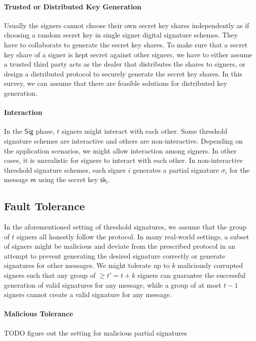 \paragraph{Trusted or Distributed Key Generation} Usually the signers cannot choose their own secret key shares independently as if choosing a random secret key in single signer digital signature schemes. They have to collaborate to generate the secret key shares. To make sure that a secret key share of a signer is kept secret against other signers, we have to either assume a trusted third party acts as the dealer that distributes the shares to signers, or design a distributed protocol to securely generate the secret key shares. In this survey, we can assume that there are feasible solutions for distributed key generation.  

\paragraph{Interaction} In the $\mathsf{Sig}$ phase, $t$ signers might interact with each other. Some threshold signature schemes are interactive and others are non-interactive. Depending on the application scenarios, we might allow interaction among signers. In other cases, it is unrealistic for signers to interact with each other. In non-interactive threshold signature schemes, each signer $i$ generates a partial signature $\sigma_i$ for the message $\mathsf{m}$ using the secret key $\mathsf{sk_i}$. 

\subsection{Fault Tolerance} 
In the aforementioned setting of threshold signatures, we assume that the group of $t$ signers all honestly follow the protocol. In many real-world settings, a subset of signers might be malicious and deviate from the prescribed protocol in an attempt to prevent generating the desired signature correctly or generate signatures for other messages. We might tolerate up to $k$ maliciously corrupted signers such that any group of $\ge t'=t+k$ signers can guarantee the successful generation of valid signatures for any message, while a group of at most $t-1$ signers cannot create a valid signature for any message. 

\paragraph{Malicious Tolerance} {\color{red} TODO figure out the setting for malicious partial signatures}

